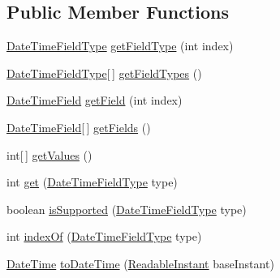 \subsection*{Public Member Functions}
\begin{DoxyCompactItemize}
\item 
\hyperlink{classorg_1_1joda_1_1time_1_1_date_time_field_type}{Date\-Time\-Field\-Type} \hyperlink{classorg_1_1joda_1_1time_1_1base_1_1_abstract_partial_aa47e74e86919de9b2b0a5b19b80072fb}{get\-Field\-Type} (int index)
\item 
\hyperlink{classorg_1_1joda_1_1time_1_1_date_time_field_type}{Date\-Time\-Field\-Type}\mbox{[}$\,$\mbox{]} \hyperlink{classorg_1_1joda_1_1time_1_1base_1_1_abstract_partial_a51a4ed15abf203a3530b031f1d74c8fe}{get\-Field\-Types} ()
\item 
\hyperlink{classorg_1_1joda_1_1time_1_1_date_time_field}{Date\-Time\-Field} \hyperlink{classorg_1_1joda_1_1time_1_1base_1_1_abstract_partial_aeefc8208d69625301414f6a0b91948df}{get\-Field} (int index)
\item 
\hyperlink{classorg_1_1joda_1_1time_1_1_date_time_field}{Date\-Time\-Field}\mbox{[}$\,$\mbox{]} \hyperlink{classorg_1_1joda_1_1time_1_1base_1_1_abstract_partial_aefd7ae2ed465ae50bb88c2a8963b41e8}{get\-Fields} ()
\item 
int\mbox{[}$\,$\mbox{]} \hyperlink{classorg_1_1joda_1_1time_1_1base_1_1_abstract_partial_a0921ffca18de76bb21ab4b86240f9bde}{get\-Values} ()
\item 
int \hyperlink{classorg_1_1joda_1_1time_1_1base_1_1_abstract_partial_aceac8b22fd87e01003163b68d41bc7d8}{get} (\hyperlink{classorg_1_1joda_1_1time_1_1_date_time_field_type}{Date\-Time\-Field\-Type} type)
\item 
boolean \hyperlink{classorg_1_1joda_1_1time_1_1base_1_1_abstract_partial_a4aa5cf59be026488511f6850ca217824}{is\-Supported} (\hyperlink{classorg_1_1joda_1_1time_1_1_date_time_field_type}{Date\-Time\-Field\-Type} type)
\item 
int \hyperlink{classorg_1_1joda_1_1time_1_1base_1_1_abstract_partial_a01f4e3ca019a2721f1ee8b77a9b32126}{index\-Of} (\hyperlink{classorg_1_1joda_1_1time_1_1_date_time_field_type}{Date\-Time\-Field\-Type} type)
\item 
\hyperlink{classorg_1_1joda_1_1time_1_1_date_time}{Date\-Time} \hyperlink{classorg_1_1joda_1_1time_1_1base_1_1_abstract_partial_ac09df7e71445efc808eb25238d6b9452}{to\-Date\-Time} (\hyperlink{interfaceorg_1_1joda_1_1time_1_1_readable_instant}{Readable\-Instant} base\-Instant)
\item 

\end{DoxyCompactItemize}
